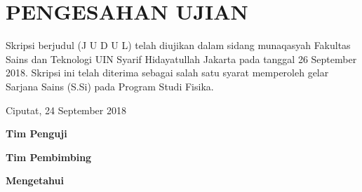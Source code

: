 \chapter*{PENGESAHAN UJIAN}
Skripsi berjudul (J U D U L) telah diujikan dalam sidang munaqasyah Fakultas Sains dan Teknologi UIN Syarif Hidayatullah Jakarta pada tanggal 26 September 2018. Skripsi ini telah diterima sebagai salah satu syarat memperoleh gelar Sarjana Sains (S.Si) pada Program Studi Fisika.

\begin{flushright}
    Ciputat, 24 September 2018
\end{flushright}

\centerline{\textbf{Tim Penguji}}

\centerline{\textbf{Tim Pembimbing}}


\centerline{\textbf{Mengetahui}}

